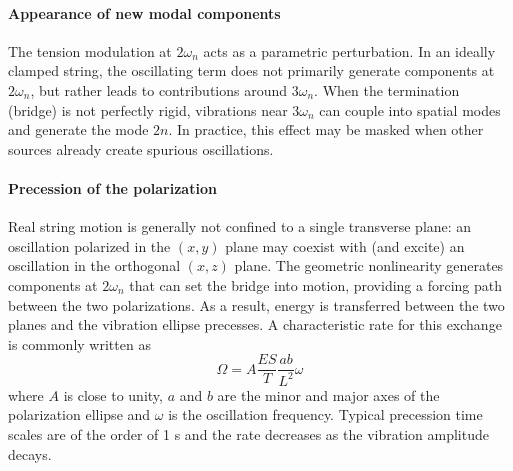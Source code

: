 \paragraph{Appearance of new modal components} The tension modulation at \( 2\omega_n \) acts as a parametric perturbation. In an ideally clamped string, the oscillating term does not primarily generate components at \( 2\omega_n \), but rather leads to contributions around \( 3\omega_n \). When the termination (bridge) is not perfectly rigid, vibrations near \( 3\omega_n \) can couple into spatial modes and generate the mode \( 2n \). In practice, this effect may be masked when other sources already create spurious oscillations.

\paragraph{Precession of the polarization} Real string motion is generally not confined to a single transverse plane: an oscillation polarized in the \( (x,y) \) plane may coexist with (and excite) an oscillation in the orthogonal \( (x,z) \) plane. The geometric nonlinearity generates components at \( 2\omega_n \) that can set the bridge into motion, providing a forcing path between the two polarizations. As a result, energy is transferred between the two planes and the vibration ellipse precesses. A characteristic rate for this exchange is commonly written as
\[
\Omega = A\frac{ES}{T}\frac{ab}{L^{2}}\omega
\]
where \( A \) is close to unity, \( a \) and \( b \) are the minor and major axes of the polarization ellipse and \( \omega \) is the oscillation frequency. Typical precession time scales are of the order of 1 s and the rate decreases as the vibration amplitude decays.
